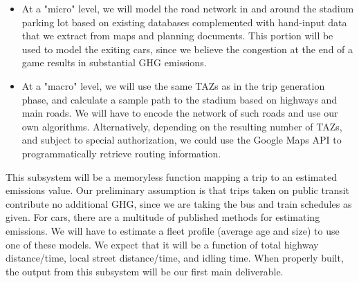 \begin{description}[style=nextline]
\begin{description}[style=nextline]
\begin{itemize}
          \item At a "micro" level, we will model the road network in
        and around the stadium parking lot based on existing databases
        complemented with hand-input data that we extract from maps
        and planning documents. This portion will be used to model the
        exiting cars, since we believe the congestion at the end of a
        game results in substantial GHG emissions.
          \item At a "macro" level, we will use the same TAZs as in
        the trip generation phase, and calculate a sample path to the
        stadium based on highways and main roads.  We will have to
        encode the network of such roads and use our own algorithms.
        Alternatively, depending on the resulting number of TAZs, and
        subject to special authorization, we could use the Google Maps
        API to programmatically retrieve routing information.
      \end{itemize}
    \end{description}
      \item[GHG Calculator] This subsystem will be a memoryless
    function mapping a trip to an estimated emissions value. Our
    preliminary assumption is that trips taken on public transit
    contribute no additional GHG, since we are taking the bus and
    train schedules as given. For cars, there are a multitude of
    published methods for estimating emissions. We will have to
    estimate a fleet profile (average age and size) to use one of
    these models. We expect that it will be a function of total
    highway distance/time, local street distance/time, and idling
    time. When properly built, the output from this subsystem will be
    our first main deliverable.
\end{description}

